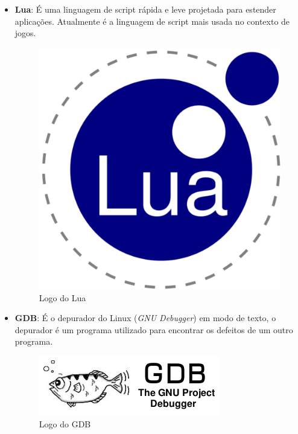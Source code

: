 \documentclass[11pt]{article} %
\begin{document}
\begin{itemize}
\item \textbf{Lua}: É uma linguagem de script rápida e leve projetada para estender aplicações. Atualmente é a linguagem de script mais usada no contexto de jogos.

\begin{figure}[!htp]
\centering
\includegraphics[scale=0.2]{res/lua.png}
\caption{Logo do Lua}
\label{Logo do Lua}
\end{figure}

\item \textbf{GDB}: É o depurador do Linux (\textit{GNU Debugger}) em modo de texto, o depurador é um programa utilizado para encontrar os defeitos de um outro programa.

\begin{figure}[!htp]
\centering
\includegraphics[scale=0.3]{res/GDB.png}
\caption{Logo do GDB}
\label{Logo do GDB}
\end{figure}


\end{itemize}
\end{document}
